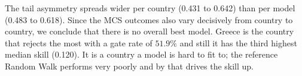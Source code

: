 The tail asymmetry spreads wider per country (0.431 to 0.642) than per model (0.483 to 0.618). Since the MCS outcomes also vary decisively from country to country, we conclude that there is no overall best model.
%
Greece is the country that rejects the most with a gate rate of $51.9\%$ and still it has the third highest median skill (0.120). It is a country a model is hard to fit to; the reference Random Walk performs very poorly and by that drives the skill up.
